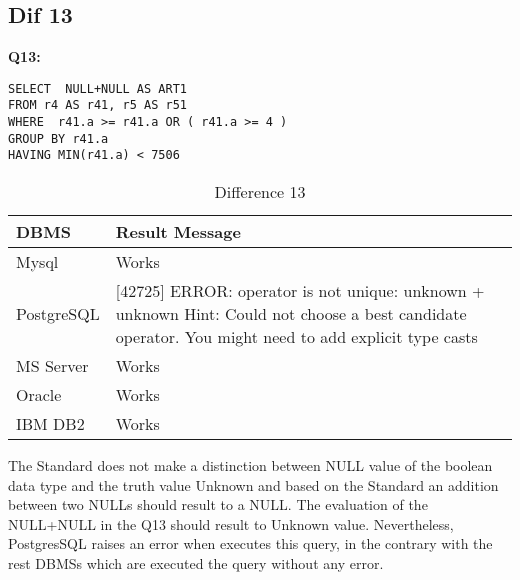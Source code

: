 \hfill\newline
\subsection{Dif 13}
 
\textbf{Q13:}
\begin{mdframed}[backgroundcolor=lightgray!20]
\begin{lstlisting}[style=SQL]
SELECT  NULL+NULL AS ART1
FROM r4 AS r41, r5 AS r51
WHERE  r41.a >= r41.a OR ( r41.a >= 4 )
GROUP BY r41.a
HAVING MIN(r41.a) < 7506
\end{lstlisting}
\end{mdframed}

\begin{table}[h]
\centering
\caption{Difference 13}
\label{my-label}
\begin{tabular}{|p{2cm}|p{11.5cm}| }
\hline
\textbf{DBMS} & \textbf{Result Message}                                                                                                                                  \\ \hline
Mysql         & Works                                                                                                                                                    \\ \hline
PostgreSQL    & {[}42725{]} ERROR: operator is not unique: unknown + unknown Hint: Could not choose a best candidate operator. You might need to add explicit type casts \\ \hline
MS Server     & Works                                                                                                                                                    \\ \hline
Oracle        & Works                                                                                                                                                    \\ \hline
IBM DB2       & Works                                                                                                                                                    \\ \hline
\end{tabular}
\end{table}

The Standard does not make a distinction between NULL value of the boolean data type and the truth value Unknown and based on the Standard an addition between two NULLs should result to a NULL. The evaluation of the NULL+NULL in the Q13 should result to Unknown value. Nevertheless, PostgresSQL raises an error when executes this query, in the contrary with the rest DBMSs which are executed the query without any error. 


